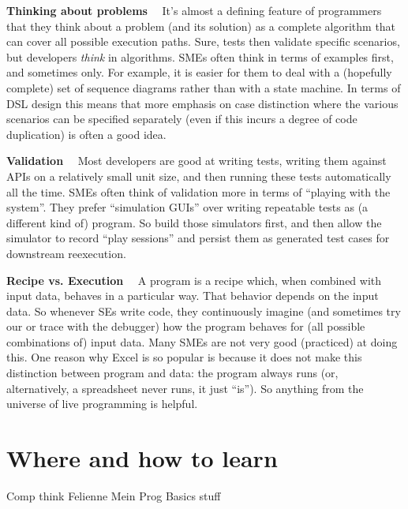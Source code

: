 \documentclass[runningheads]{llncs}
\newcommand\parhead[1]{\vspace{1mm}\noindent\textbf{{#1}}\ \ }
\begin{document}
\parhead{Thinking about problems} It's almost a defining feature of programmers
that they think about a problem (and its solution) as a complete algorithm
that can cover all possible execution paths. Sure, tests then validate 
specific scenarios, but developers \emph{think} in algorithms. SMEs often
think in terms of examples first, and sometimes only. For example, it is easier
for them to deal with a (hopefully complete) set of sequence diagrams rather
than with a state machine. In terms of DSL design this means that more
emphasis on case distinction where the various scenarios can be specified
separately (even if this incurs a degree of code duplication) is often 
a good idea.

\parhead{Validation} Most developers are good at writing tests, writing
them against APIs on a relatively small unit size, and then running these
tests automatically all the time. SMEs often think of validation more in
terms of ``playing with the system''. They prefer ``simulation GUIs'' over
writing repeatable tests as (a different kind of) program. So build those
simulators first, and then allow the simulator to record ``play sessions''
and persist them as generated test cases for downstream reexecution.

\parhead{Recipe vs. Execution} A program is a recipe which, when combined
with input data, behaves in a particular way. That behavior depends on the
input data. So whenever SEs write code, they continuously imagine (and sometimes
try our or trace with the debugger) how the program behaves for (all possible
combinations of) input data. Many SMEs are not very good (practiced) at doing
this. One reason why Excel is so popular is because it does not make this
distinction between program and data: the program always runs (or, alternatively,
a spreadsheet never runs, it just ``is''). So anything from the universe of
live programming is helpful.


\section{Where and how to learn}

Comp think
Felienne
Mein Prog Basics stuff












\end{document}
